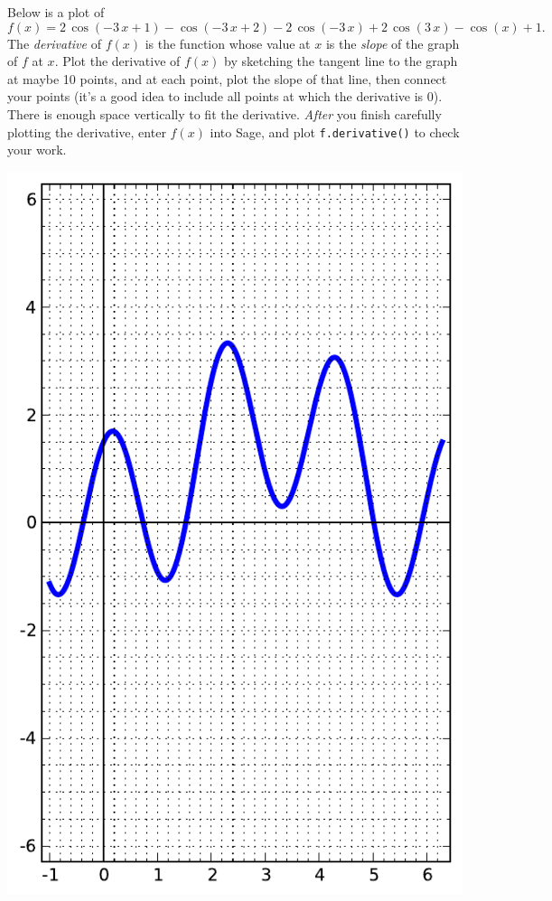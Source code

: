 Below is a plot of $$f(x)=2 \, \cos\left(-3 \, x + 1\right) - \cos\left(-3 \, x + 2\right) - 2 \, \cos\left(-3 \, x\right) + 2 \, \cos\left(3 \, x\right) - \cos\left(x\right) + 1.$$  The {\em \color{red}derivative} of $f(x)$ is the function whose value at $x$ is the {\em slope} of the graph of $f$ at $x$.  Plot the derivative of $f(x)$ by sketching the tangent line to the graph at maybe 10 points, and at each point, plot the slope of that line, then connect your points (it's a good idea to include all points at which the derivative is 0).  There is enough space vertically to fit the derivative.  {\em After} you finish carefully plotting the derivative, enter $f(x)$ into Sage, and plot {\color{blue}\verb|f.derivative()|} to check your work.
\begin{center}\includegraphics{functions/42.pdf}\end{center}\newpage

